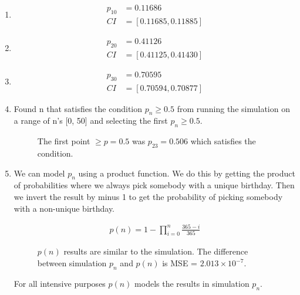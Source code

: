 \documentclass[twocolumn]{article}
\begin{document}
\begin{enumerate}[label=\alph*)]
    
\vspace{-10pt}
\item \begin{align*}
p_{10} &= 0.11686 \\
CI &= [0.11685, 0.11885]
\end{align*}

\vspace{-10pt}
\item \begin{align*}
p_{20} &=  0.41126 \\
CI &= [0.41125, 0.41430]
\end{align*}

\vspace{-10pt}
\item \begin{align*}
p_{30} &= 0.70595 \\
CI &= [0.70594, 0.70877]
\end{align*}

\item 
Found n that satisfies the condition $p_n \ge 0.5$ from running the simulation on a range of n's [0, 50] and selecting the first $p_n \ge 0.5$.
	
\begin{figure}[H]
    \centering
    \caption{The first point $\geq p=0.5$ was $p_{23}=0.506$ which satisfies the condition.}
\end{figure}


\item 
We can model $p_n$ using a product function. We do this by getting the product of probabilities where we always pick somebody with a unique birthday. Then we invert the result by minus 1 to get the probability of picking somebody with a non-unique birthday.

\vspace{-10pt}
\begin{align*}
p(n) = 1 - \prod_{i=0}^{n} \frac{\text{365} - i}{365}
\end{align*}
\vspace{-10pt}

\begin{figure}[H]
    \centering
    \caption{$p(n)$ results are similar to the simulation. The difference between simulation $p_n$ and $p(n)$ is MSE = $2.013\times10^{-7}$.}
\end{figure}
\vspace{-14pt}
For all intensive purposes $p(n)$ models the results in simulation $p_n$. 

\end{enumerate}
\end{document}

